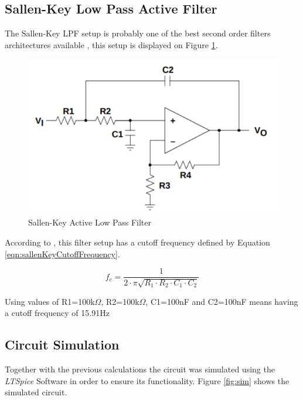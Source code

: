 	\subsection{Sallen-Key Low Pass Active Filter}\label{ssec:sallen-key-low-pass-active-filter}
	
		The Sallen-Key LPF setup is probably one of the best second order filters architectures available \cite{dorfsvodoba2014}, this setup is displayed on Figure \ref{fig:sallenKeyLPF}.

		\begin{figure}[htbp]
			\centering
			\includegraphics[width=.8\textwidth]{figuras/fig-sallenKeyLPF}
			\caption{Sallen-Key Active Low Pass Filter \cite{texas1999sallenkey}}
			\label{fig:sallenKeyLPF}
		\end{figure}

		According to \cite{texas1999sallenkey}, this filter setup has a cutoff frequency defined by Equation \ref{eqn:sallenKeyCutoffFrequency}.

		\begin{equation}\label{eqn:sallenKeyCutoffFrequency}
			f_{c}=\frac{1}{2 \cdot \pi \sqrt{R_{1} \cdot R_{2} \cdot C_{1} \cdot C_{2}}} 
		\end{equation}

		Using values of R1=100k$\Omega$, R2=100k$\Omega$, C1=100nF and C2=100nF means having a cutoff frequency of 15.91Hz

	\subsection{Circuit Simulation}\label{ssec:circuit-simulation}

		Together with the previous calculations the circuit was simulated using the \textit{LTSpice} Software in order to ensure its functionality. Figure \ref{fig:sim} shows the simulated circuit.


